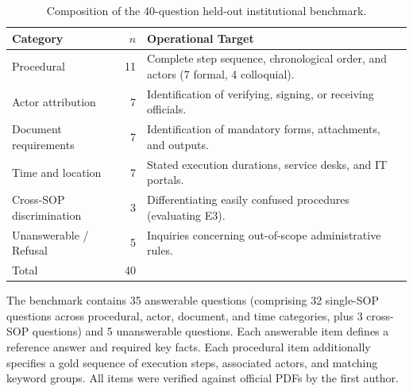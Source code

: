 \documentclass[preprint,10pt]{elsarticle}
\begin{document}
\begin{table}[!htbp]
\centering
\caption{Composition of the 40-question held-out institutional benchmark.}
\label{tab:bench}
\small
\setlength{\tabcolsep}{4pt}
\begin{tabularx}{\textwidth}{lr>{\raggedright\arraybackslash}X}
\toprule
Category & $n$ & Operational Target \\
\midrule
Procedural & 11 & Complete step sequence, chronological order, and actors (7 formal, 4 colloquial). \\
Actor attribution & 7 & Identification of verifying, signing, or receiving officials. \\
Document requirements & 7 & Identification of mandatory forms, attachments, and outputs. \\
Time and location & 7 & Stated execution durations, service desks, and IT portals. \\
Cross-SOP discrimination & 3 & Differentiating easily confused procedures (evaluating E3). \\
Unanswerable / Refusal & 5 & Inquiries concerning out-of-scope administrative rules. \\
\midrule
Total & 40 & \\
\bottomrule
\end{tabularx}
\end{table}

The benchmark contains 35 answerable questions (comprising 32 single-SOP questions across procedural, actor, document, and time categories, plus 3 cross-SOP questions) and 5 unanswerable questions. Each answerable item defines a reference answer and required key facts. Each procedural item additionally specifies a gold sequence of execution steps, associated actors, and matching keyword groups. All items were verified against official PDFs by the first author.
\end{document}
